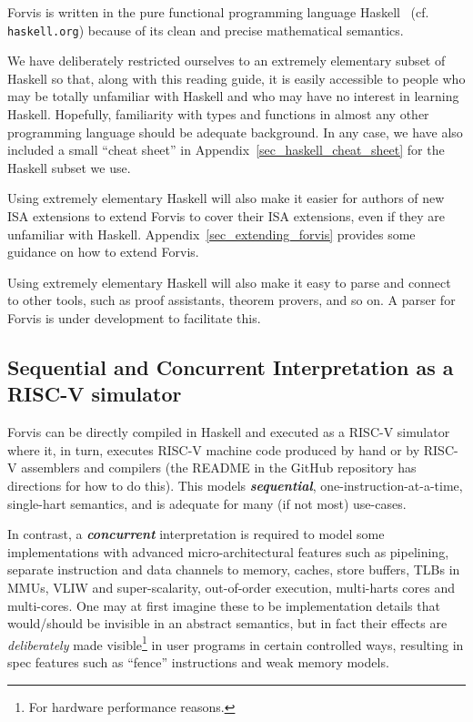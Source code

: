 \documentclass[11pt]{article}
\begin{document}
Forvis is written in the pure functional programming language
Haskell~\cite{PeytonJones2003} (cf. {\tt haskell.org}) because of its
clean and precise mathematical semantics.

We have deliberately restricted ourselves to an extremely elementary
subset of Haskell so that, along with this reading guide, it is easily
accessible to people who may be totally unfamiliar with Haskell and
who may have no interest in learning Haskell.  Hopefully, familiarity
with types and functions in almost any other programming language
should be adequate background.  In any case, we have also included a
small ``cheat sheet'' in Appendix~\ref{sec_haskell_cheat_sheet} for
the Haskell subset we use.

Using extremely elementary Haskell will also make it easier for authors of
new ISA extensions to extend Forvis to cover their ISA extensions,
even if they are unfamiliar with Haskell.
Appendix~\ref{sec_extending_forvis} provides some guidance on how to
extend Forvis.

Using extremely elementary Haskell will also make it easy to parse and
connect to other tools, such as proof assistants, theorem provers, and
so on.  A parser for Forvis is under development to facilitate this.


\subsection{Sequential and Concurrent Interpretation as a RISC-V simulator}

\label{sec_sequential_and_concurrent}

Forvis can be directly compiled in Haskell and executed as a RISC-V
simulator where it, in turn, executes RISC-V machine code produced by
hand or by RISC-V assemblers and compilers (the README in the GitHub
repository has directions for how to do this).  This models
{\bf\emph{sequential}}, one-instruction-at-a-time, single-hart
semantics, and is adequate for many (if not most) use-cases.

In contrast, a {\bf\emph{concurrent}} interpretation is required to
model some implementations with advanced micro-architectural features
such as pipelining, separate instruction and data channels to memory,
caches, store buffers, TLBs in MMUs, VLIW and super-scalarity,
out-of-order execution, multi-harts cores and multi-cores.  One may at
first imagine these to be implementation details that would/should be
invisible in an abstract semantics, but in fact their effects are
\emph{deliberately} made visible\footnote{For hardware performance
reasons.} in user programs in certain controlled ways, resulting in
spec features such as ``fence'' instructions and weak memory models.
\end{document}
